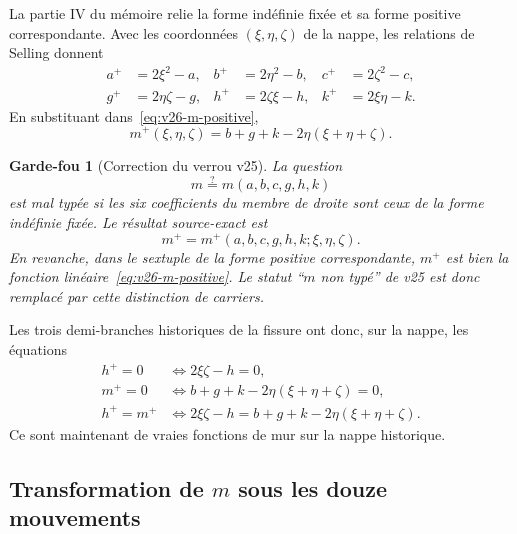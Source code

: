 \documentclass[11pt,a4paper]{article}
\newtheorem{guardrail}[theorem]{Garde-fou}
\begin{document}
La partie IV du mémoire relie la forme indéfinie fixée et sa forme positive correspondante. Avec les coordonnées $(\xi,\eta,\zeta)$ de la nappe, les relations de Selling donnent
\begin{equation}\label{eq:v26-positive-pullback}
 \boxed{
 \begin{aligned}
 a^+&=2\xi^2-a,&
 b^+&=2\eta^2-b,&
 c^+&=2\zeta^2-c,\\
 g^+&=2\eta\zeta-g,&
 h^+&=2\zeta\xi-h,&
 k^+&=2\xi\eta-k.
 \end{aligned}}
\end{equation}
En substituant dans~\eqref{eq:v26-m-positive},
\begin{equation}\label{eq:v26-m-hyperboloid}
 \boxed{
 m^+(\xi,\eta,\zeta)
 =
 b+g+k
 -
 2\eta(\xi+\eta+\zeta).}
\end{equation}

\begin{guardrail}[Correction du verrou v25]
La question
\[
 m\stackrel?=m(a,b,c,g,h,k)
\]
est mal typée si les six coefficients du membre de droite sont ceux de la \emph{forme indéfinie fixée}. Le résultat source-exact est
\[
 \boxed{
 m^+=m^+(a,b,c,g,h,k;\xi,\eta,\zeta).}
\]
En revanche, dans le sextuple de la \emph{forme positive correspondante}, $m^+$ est bien la fonction linéaire~\eqref{eq:v26-m-positive}. Le statut ``$m$ non typé'' de v25 est donc remplacé par cette distinction de carriers.
\end{guardrail}

Les trois demi-branches historiques de la fissure ont donc, sur la nappe, les équations
\begin{equation}\label{eq:v26-fissure-pullback-walls}
 \boxed{
 \begin{aligned}
 h^+=0
 &\iff
 2\xi\zeta-h=0,\\
 m^+=0
 &\iff
 b+g+k-2\eta(\xi+\eta+\zeta)=0,\\
 h^+=m^+
 &\iff
 2\xi\zeta-h
 =
 b+g+k-2\eta(\xi+\eta+\zeta).
 \end{aligned}}
\end{equation}
Ce sont maintenant de vraies fonctions de mur sur la nappe historique.

\subsection{Transformation de \texorpdfstring{$m$}{m} sous les douze mouvements}
\end{document}
